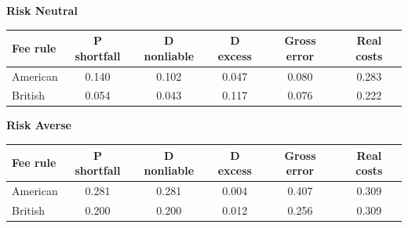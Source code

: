 \documentclass[10pt,border=5pt,varwidth=17cm]{standalone}
\begin{document}
\begingroup
\small
\setlength{\tabcolsep}{5pt}
\renewcommand{\arraystretch}{1.20}
\noindent\textbf{Risk Neutral}\par\smallskip
\noindent\begin{tabularx}{\linewidth}{@{}>{\raggedright\arraybackslash}Xccccc@{}}
\toprule
\textbf{Fee rule} & \textbf{P shortfall} & \textbf{D nonliable} & \textbf{D excess} & \textbf{Gross error} & \textbf{Real costs} \\
\midrule
American & 0.140 & 0.102 & 0.047 & 0.080 & 0.283 \\
British & 0.054 & 0.043 & 0.117 & 0.076 & 0.222 \\
\bottomrule\end{tabularx}\par\medskip
\noindent\textbf{Risk Averse}\par\smallskip
\noindent\begin{tabularx}{\linewidth}{@{}>{\raggedright\arraybackslash}Xccccc@{}}
\toprule
\textbf{Fee rule} & \textbf{P shortfall} & \textbf{D nonliable} & \textbf{D excess} & \textbf{Gross error} & \textbf{Real costs} \\
\midrule
American & 0.281 & 0.281 & 0.004 & 0.407 & 0.309 \\
British & 0.200 & 0.200 & 0.012 & 0.256 & 0.309 \\
\bottomrule\end{tabularx}\par\medskip
\endgroup
\end{document}
